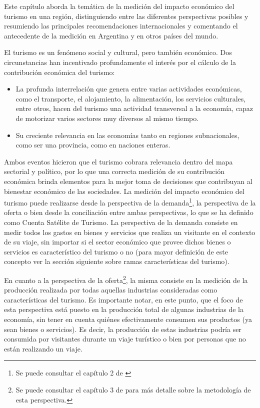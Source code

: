 \documentclass[
  openany]{book}
\begin{document}
Este capítulo aborda la temática de la medición del impacto económico del turismo en una región, distinguiendo entre las diferentes perspectivas posibles y resumiendo las principales recomendaciones internacionales y comentando el antecedente de la medición en Argentina y en otros países del mundo.

El turismo es un fenómeno social y cultural, pero también económico. Dos circunstancias han incentivado profundamente el interés por el cálculo de la contribución económica del turismo:

\begin{itemize}
\item
  La profunda interrelación que genera entre varias actividades económicas, como el transporte, el alojamiento, la alimentación, los servicios culturales, entre otros, hacen del turismo una actividad transversal a la economía, capaz de motorizar varios sectores muy diversos al mismo tiempo.
\item
  Su creciente relevancia en las economías tanto en regiones subnacionales, como ser una provincia, como en naciones enteras.
\end{itemize}

Ambos eventos hicieron que el turismo cobrara relevancia dentro del mapa sectorial y político, por lo que una correcta medición de su contribución económica brinda elementos para la mejor toma de decisiones que contribuyan al bienestar económico de las sociedades. La medición del impacto económico del turismo puede realizarse desde la perspectiva de la demanda\footnote{Se puede consultar el capítulo 2 de \citet{cstrmc2008}}, la perspectiva de la oferta o bien desde la conciliación entre ambas perspectivas, lo que se ha definido como Cuenta Satélite de Turismo. La perspectiva de la demanda consiste en medir todos los gastos en bienes y servicios que realiza un visitante en el contexto de su viaje, sin importar si el sector económico que provee dichos bienes o servicios es característico del turismo o no (para mayor definición de este concepto ver la sección siguiente sobre ramas características del turismo).

En cuanto a la perspectiva de la oferta\footnote{Se puede consultar el capítulo 3 de \citet{cstrmc2008} para más detalle sobre la metodología de esta perspectiva.}, la misma consiste en la medición de la producción realizada por todas aquellas industrias consideradas como características del turismo. Es importante notar, en este punto, que el foco de esta perspectiva está puesto en la producción total de algunas industrias de la economía, sin tener en cuenta quiénes efectivamente consumen sus productos (ya sean bienes o servicios). Es decir, la producción de estas industrias podría ser consumida por visitantes durante un viaje turístico o bien por personas que no están realizando un viaje.
\end{document}
